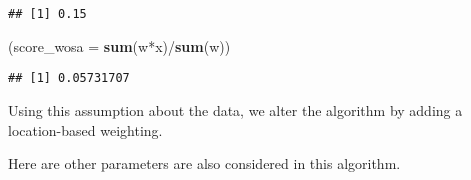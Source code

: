 \documentclass[]{article}
\newenvironment{Shaded}{\begin{snugshade}}{\end{snugshade}}
\newcommand{\KeywordTok}[1]{\textcolor[rgb]{0.13,0.29,0.53}{\textbf{{#1}}}}
\newcommand{\DataTypeTok}[1]{\textcolor[rgb]{0.13,0.29,0.53}{{#1}}}
\newcommand{\NormalTok}[1]{{#1}}
\begin{document}
\begin{verbatim}
## [1] 0.15
\end{verbatim}

\begin{Shaded}
\begin{Highlighting}[]
\NormalTok{(}\DataTypeTok{score_wosa =} \KeywordTok{sum}\NormalTok{(w*x)/}\KeywordTok{sum}\NormalTok{(w))}
\end{Highlighting}
\end{Shaded}

\begin{verbatim}
## [1] 0.05731707
\end{verbatim}

Using this assumption about the data, we alter the algorithm by adding a
location-based weighting.

Here are other parameters are also considered in this algorithm.
\end{document}
